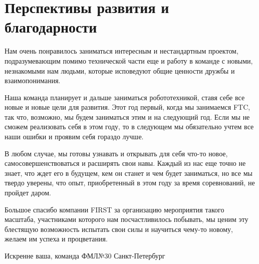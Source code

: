 
\section{Перспективы развития и благодарности}
    Нам очень понравилось заниматься интересным и нестандартным проектом, подразумевающим помимо технической части еще и работу в команде с новыми, незнакомыми нам людьми, которые исповедуют общие ценности дружбы и взаимопонимания.
    
    Наша команда планирует и дальше заниматься робототехникой, ставя себе все новые и новые цели для развития. Этот год первый, когда мы занимаемся FTC, так что, возможно, мы будем заниматься этим и на следующий год. Если мы не сможем реализовать себя в этом году, то в следующем мы обязательно учтем все наши ошибки и проявим себя гораздо лучше.
    
    В любом случае, мы готовы узнавать и открывать для себя что-то новое, самосовершенствоваться и расширять свои навы.
     Каждый из нас еще точно не знает, что ждет его в будущем, кем он станет и чем будет заниматься, но все мы твердо уверены, что опыт, приобретенный в этом году за время соревнований, не пройдет даром.
    
    Большое спасибо компании FIRST за организацию мероприятия такого масштаба, участниками которого нам посчастливилось побывать, мы ценим эту блестящую возможность испытать свои силы и научиться чему-то новому, желаем им успеха и процветания.
    
    \begin{center}
      Искренне ваша, команда ФМЛ№30 Санкт-Петербург
    \end{center}
\newpage
